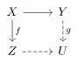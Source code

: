 \documentclass[12pt]{standalone}
\begin{document}
        $$

\begin{tikzcd} 
    X \ar[r] \ar[d,"f"] & Y \ar[d,"g",dashed] \\
    Z \ar[r,dashed] & U 
\end{tikzcd}
        $$
        
\end{document}
